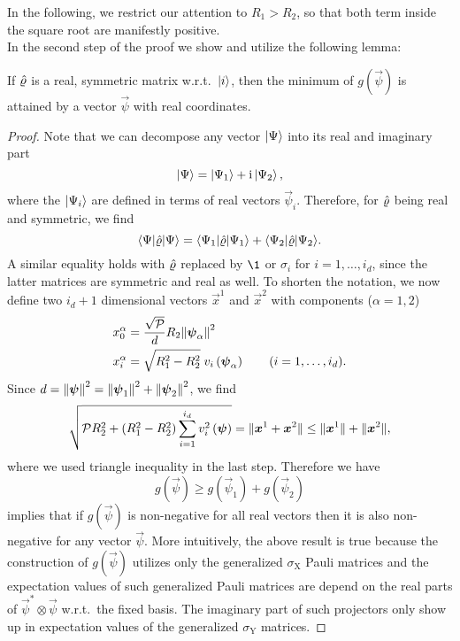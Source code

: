 In the following, we restrict our attention to  $R_{1}>R_{2}$, so that both term inside the square root are manifestly positive.\\
In the second step of the proof we show and utilize the following lemma:
\begin{lemma}\label{lem:ellpos.real_min}
  If $\hat{\varrho}$ is a real, symmetric matrix w.r.t.\ $\ket{i}$, then the minimum of $g(\vec\psi)$ is attained by a vector $\vec{\psi}$ with real coordinates.
\end{lemma}
\begin{proof}
  Note that we can decompose any vector $\ket\Psi$ into its real and imaginary part
  \[
    \ket\Psi = \ket{\Psi_1} + \ii\Ket{\Psi_2},
  \]
  where the $\ket{\Psi_i}$ are defined in terms of real vectors $\vec\psi_i$.
  Therefore, for $\hat{\varrho}$ being real and symmetric, we find
  \[
    \bra{\Psi} \estim\varrho \ket{\Psi} = \bra{\Psi_1} \estim\varrho \ket{\Psi_1} + \bra{\Psi_2} \estim\varrho \ket{\Psi_2}.
  \]
  A similar equality holds with $\hat{\varrho}$ replaced by $\1$ or $\sigma_i$ for $i=1,\ldots,i_d$, since the latter matrices are symmetric and real as well.
  To shorten the notation, we now define two $i_d+1$ dimensional vectors $\vec x^1$ and $\vec x^2$ with components ($\alpha=1,2$)
  \[
    \begin{split}
      x^\alpha_0 &= \frac{\sqrt{\mathcal{P}}}{d} R_2 {\Vert{\boldsymbol{\psi}}_\alpha\Vert}^2 \\
      x^\alpha_i &= \sqrt{R_1^2 - R_2^2}\;v_i\left({\boldsymbol{\psi}}_\alpha\right) \qquad (i=1,\ldots,i_d).
    \end{split}
  \]
  Since $d = {\Vert{\boldsymbol{\psi}}\Vert}^2 = {\Vert{\boldsymbol{\psi}}_1\Vert}^2 + {\Vert{\boldsymbol{\psi}}_2\Vert}^2$, we find
  \[
  \sqrt{ \mathcal{P} R_2^2 + (R_1^2 - R_2^2) \sum_{i=1}^{i_d} v_{i}^{2}\left({\boldsymbol{\psi}}\right)} = {\Vert{\boldsymbol{x}}^1 + {\boldsymbol{x}}^2\Vert} \le {\Vert{\boldsymbol{x}}^1\Vert} + {\Vert{\boldsymbol{x}}^2\Vert},
  \]
  where we used triangle inequality in the last step.
  Therefore we have
  \[
    \label{eq:ellpos.g_decomp}
    g(\vec\psi) \geq  g(\vec\psi_1) + g(\vec\psi_2)
  \]
   implies that if $g(\vec\psi)$ is non-negative for all real vectors then it is also non-negative for any vector $\vec\psi$.
  More intuitively, the above result is true because the construction of $g(\vec\psi)$ utilizes only the generalized $\sigma_\mathrm{X}$ Pauli matrices and the expectation values of such generalized Pauli matrices are depend on the real parts of $\vec\psi^*\otimes\vec\psi$ w.r.t.\ the fixed basis.
  The imaginary part of such projectors only show up in expectation values of the generalized $\sigma_\mathrm{Y}$ matrices.
\end{proof}

